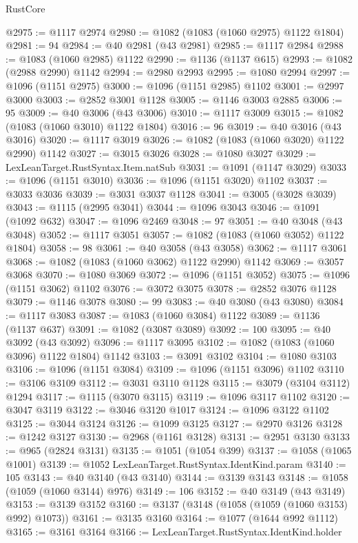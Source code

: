 \begin{lexlean}{RustCore}
\begin{coremodule}
@2975 := @1117 @2974
@2980 := @1082 (@1083 (@1060 @2975) @1122 @1804)
@2981 := 94
@2984 := @40 @2981 (@43 @2981)
@2985 := @1117 @2984
@2988 := @1083 (@1060 @2985) @1122
@2990 := @1136 (@1137 @615)
@2993 := @1082 (@2988 @2990) @1142
@2994 := @2980 @2993
@2995 := @1080 @2994
@2997 := @1096 (@1151 @2975)
@3000 := @1096 (@1151 @2985) @1102
@3001 := @2997 @3000
@3003 := @2852 @3001 @1128
@3005 := @1146 @3003 @2885
@3006 := 95
@3009 := @40 @3006 (@43 @3006)
@3010 := @1117 @3009
@3015 := @1082 (@1083 (@1060 @3010) @1122 @1804)
@3016 := 96
@3019 := @40 @3016 (@43 @3016)
@3020 := @1117 @3019
@3026 := @1082 (@1083 (@1060 @3020) @1122 @2990) @1142
@3027 := @3015 @3026
@3028 := @1080 @3027
@3029 := LexLeanTarget.RustSyntax.Item.natSub
@3031 := @1091 (@1147 @3029)
@3033 := @1096 (@1151 @3010)
@3036 := @1096 (@1151 @3020) @1102
@3037 := @3033 @3036
@3039 := @3031 @3037 @1128
@3041 := @3005 (@3028 @3039)
@3043 := @1115 (@2995 @3041)
@3044 := @1096 @3043
@3046 := @1091 (@1092 @632)
@3047 := @1096 @2469
@3048 := 97
@3051 := @40 @3048 (@43 @3048)
@3052 := @1117 @3051
@3057 := @1082 (@1083 (@1060 @3052) @1122 @1804)
@3058 := 98
@3061 := @40 @3058 (@43 @3058)
@3062 := @1117 @3061
@3068 := @1082 (@1083 (@1060 @3062) @1122 @2990) @1142
@3069 := @3057 @3068
@3070 := @1080 @3069
@3072 := @1096 (@1151 @3052)
@3075 := @1096 (@1151 @3062) @1102
@3076 := @3072 @3075
@3078 := @2852 @3076 @1128
@3079 := @1146 @3078
@3080 := 99
@3083 := @40 @3080 (@43 @3080)
@3084 := @1117 @3083
@3087 := @1083 (@1060 @3084) @1122
@3089 := @1136 (@1137 @637)
@3091 := @1082 (@3087 @3089)
@3092 := 100
@3095 := @40 @3092 (@43 @3092)
@3096 := @1117 @3095
@3102 := @1082 (@1083 (@1060 @3096) @1122 @1804) @1142
@3103 := @3091 @3102
@3104 := @1080 @3103
@3106 := @1096 (@1151 @3084)
@3109 := @1096 (@1151 @3096) @1102
@3110 := @3106 @3109
@3112 := @3031 @3110 @1128
@3115 := @3079 (@3104 @3112) @1294
@3117 := @1115 (@3070 @3115)
@3119 := @1096 @3117 @1102
@3120 := @3047 @3119
@3122 := @3046 @3120 @1017
@3124 := @1096 @3122 @1102
@3125 := @3044 @3124
@3126 := @1099 @3125
@3127 := @2970 @3126
@3128 := @1242 @3127
@3130 := @2968 (@1161 @3128)
@3131 := @2951 @3130
@3133 := @965 (@2824 @3131)
@3135 := @1051 (@1054 @399)
@3137 := @1058 (@1065 @1001)
@3139 := @1052 LexLeanTarget.RustSyntax.IdentKind.param
@3140 := 105
@3143 := @40 @3140 (@43 @3140)
@3144 := @3139 @3143
@3148 := @1058 (@1059 (@1060 @3144) @976)
@3149 := 106
@3152 := @40 @3149 (@43 @3149)
@3153 := @3139 @3152
@3160 := @3137 (@3148 (@1058 (@1059 (@1060 @3153) @992) @1073))
@3161 := @3135 @3160
@3164 := @1077 (@1644 @992 @1112)
@3165 := @3161 @3164
@3166 := LexLeanTarget.RustSyntax.IdentKind.holder

\end{coremodule}
\end{lexlean}
